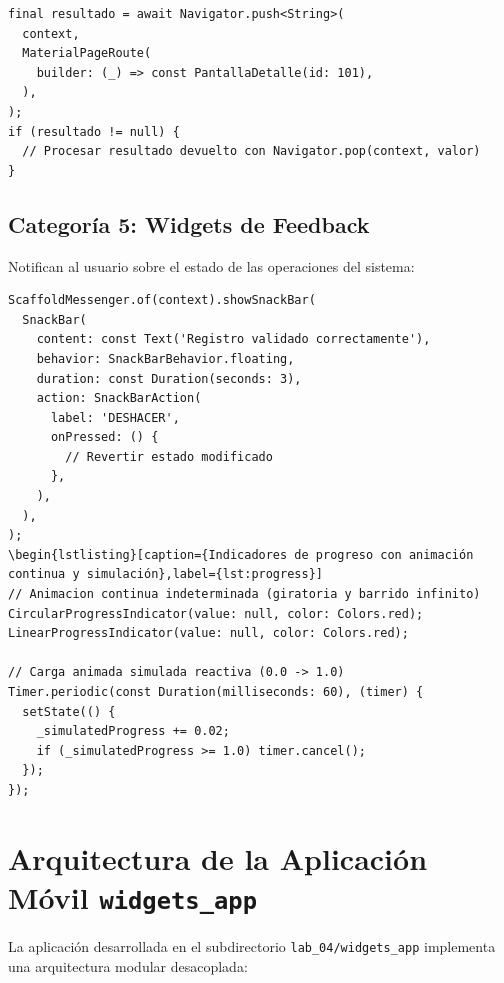 \documentclass[12pt,a4paper]{article}
\begin{document}
\begin{lstlisting}[caption={Navegación con retorno de parámetros asíncronos},label={lst:nav}]
final resultado = await Navigator.push<String>(
  context,
  MaterialPageRoute(
    builder: (_) => const PantallaDetalle(id: 101),
  ),
);
if (resultado != null) {
  // Procesar resultado devuelto con Navigator.pop(context, valor)
}
\end{lstlisting}

\subsection{Categoría 5: Widgets de Feedback}
Notifican al usuario sobre el estado de las operaciones del sistema:

\begin{lstlisting}[caption={Emisión de SnackBar flotante con acción reversible},label={lst:snackbar}]
ScaffoldMessenger.of(context).showSnackBar(
  SnackBar(
    content: const Text('Registro validado correctamente'),
    behavior: SnackBarBehavior.floating,
    duration: const Duration(seconds: 3),
    action: SnackBarAction(
      label: 'DESHACER',
      onPressed: () {
        // Revertir estado modificado
      },
    ),
  ),
);
\begin{lstlisting}[caption={Indicadores de progreso con animación continua y simulación},label={lst:progress}]
// Animacion continua indeterminada (giratoria y barrido infinito)
CircularProgressIndicator(value: null, color: Colors.red);
LinearProgressIndicator(value: null, color: Colors.red);

// Carga animada simulada reactiva (0.0 -> 1.0)
Timer.periodic(const Duration(milliseconds: 60), (timer) {
  setState(() {
    _simulatedProgress += 0.02;
    if (_simulatedProgress >= 1.0) timer.cancel();
  });
});
\end{lstlisting}

\section{Arquitectura de la Aplicación Móvil \texttt{widgets\_app}}

La aplicación desarrollada en el subdirectorio \texttt{lab\_04/widgets\_app} implementa una arquitectura modular desacoplada:
\end{document}
